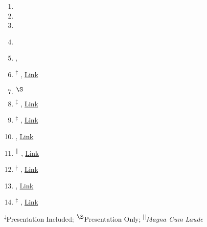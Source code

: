 \normalsize
\begin{center}
\begin{minipage}{0.95\textwidth}
	\begin{enumerate}[leftmargin=5mm,itemsep=2mm]
	\item {}
	\item {}
	\item {}
	\item {} \label{ans_2012_paper}

	\item {}, \label{ieee_nss_paper}
	\item \textsuperscript{$\ddagger$}  , 
		\href{https://laws.lanl.gov/vhosts/mcnp.lanl.gov/pdf_files/la-ur-17-20353.pdf}{Link}   \label{ans_summer2017_paper}
	\item \textsuperscript{$\S$}  \label{ans_summer2017_jrt_paper}
	\item \textsuperscript{$\ddagger$}  , 
		\href{https://app.box.com/s/kbe3jlwsq0qxcyrirneqpodl3mqoz3n3}{Link}\label{caari_2016_paper_1}
	\item \textsuperscript{$\ddagger$}  , 
		\href{https://app.box.com/s/sqx0ddl77lg0vue0ahffhdr9pclmlybi}{Link}\label{caari_2016_paper_2}
	\item  {}, 
		\href{https://app.box.com/s/raujd5ok40d45qaeq3lx2r6akdv8xfqx}{Link}\label{ans_winter2016_paper}
	\item \textsuperscript{$||$}   , 
		\href{http://cds.ismrm.org/protected/16MPresentations/abstracts/1108.html}{Link}\label{ismrm_2016_paper}
	\item \textsuperscript{$\dagger$} , 
		\href{https://app.box.com/s/yc0aft4oafsgg6f6qhzjpvbgouql0lle}{Link}\label{cmrr_2015_paper}
        \item {}, 
		\href{https://app.box.com/s/bj7sbfqana8sixv70nu6afa5i5mfuamt}{Link}\label{ismrm_2014_paper}
	\item \textsuperscript{$\ddagger$}  , 
		\href{https://app.box.com/s/rqnshtxi4umq1lm2m5g7fcd16m1ztap0}{Link}\label{abaqus_2012_paper}
   \end{enumerate}
\end{minipage}
\end{center}

\footnotesize
\begin{center}
\textsuperscript{$\ddagger$}Presentation Included; \textsuperscript{$\S$}Presentation Only; \textsuperscript{$||$}\textit{Magna Cum Laude}
\end{center}
